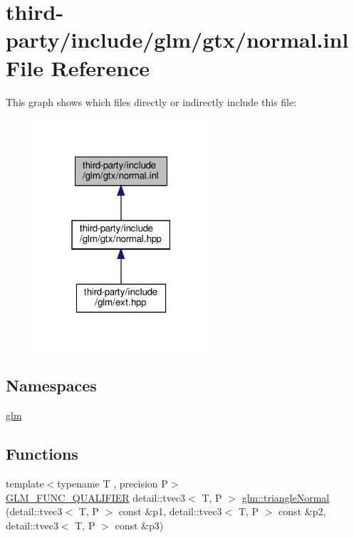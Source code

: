 \hypertarget{normal_8inl}{}\section{third-\/party/include/glm/gtx/normal.inl File Reference}
\label{normal_8inl}
This graph shows which files directly or indirectly include this file\+:
\nopagebreak
\begin{figure}[H]
\begin{center}
\leavevmode
\includegraphics[width=183pt]{normal_8inl__dep__incl}
\end{center}
\end{figure}
\subsection*{Namespaces}
\begin{DoxyCompactItemize}
\item 
 \hyperlink{namespaceglm}{glm}
\end{DoxyCompactItemize}
\subsection*{Functions}
\begin{DoxyCompactItemize}
\item 
{\footnotesize template$<$typename T , precision P$>$ }\\\hyperlink{setup_8hpp_a33fdea6f91c5f834105f7415e2a64407}{G\+L\+M\+\_\+\+F\+U\+N\+C\+\_\+\+Q\+U\+A\+L\+I\+F\+I\+ER} detail\+::tvec3$<$ T, P $>$ \hyperlink{group__gtx__normal_gadd95b70793270eaeec13e2e8788b71d2}{glm\+::triangle\+Normal} (detail\+::tvec3$<$ T, P $>$ const \&p1, detail\+::tvec3$<$ T, P $>$ const \&p2, detail\+::tvec3$<$ T, P $>$ const \&p3)
\end{DoxyCompactItemize}
